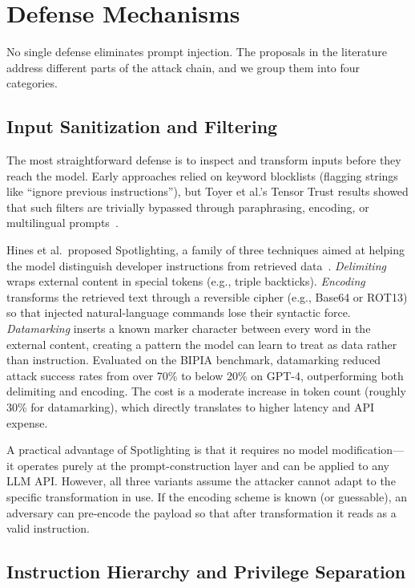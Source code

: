 \section{Defense Mechanisms}
\label{sec:defenses}

No single defense eliminates prompt injection. The proposals in the literature address different parts of the attack chain, and we group them into four categories.

\subsection{Input Sanitization and Filtering}

The most straightforward defense is to inspect and transform inputs before they reach the model. Early approaches relied on keyword blocklists (flagging strings like ``ignore previous instructions''), but Toyer et al.'s Tensor Trust results showed that such filters are trivially bypassed through paraphrasing, encoding, or multilingual prompts~\cite{toyer2024tensor}.

Hines et al.\ proposed Spotlighting, a family of three techniques aimed at helping the model distinguish developer instructions from retrieved data~\cite{hines2024spotlighting}. \emph{Delimiting} wraps external content in special tokens (e.g., triple backticks). \emph{Encoding} transforms the retrieved text through a reversible cipher (e.g., Base64 or ROT13) so that injected natural-language commands lose their syntactic force. \emph{Datamarking} inserts a known marker character between every word in the external content, creating a pattern the model can learn to treat as data rather than instruction. Evaluated on the BIPIA benchmark, datamarking reduced attack success rates from over 70\% to below 20\% on GPT-4, outperforming both delimiting and encoding. The cost is a moderate increase in token count (roughly 30\% for datamarking), which directly translates to higher latency and API expense.

A practical advantage of Spotlighting is that it requires no model modification---it operates purely at the prompt-construction layer and can be applied to any LLM API. However, all three variants assume the attacker cannot adapt to the specific transformation in use. If the encoding scheme is known (or guessable), an adversary can pre-encode the payload so that after transformation it reads as a valid instruction.

\subsection{Instruction Hierarchy and Privilege Separation}

